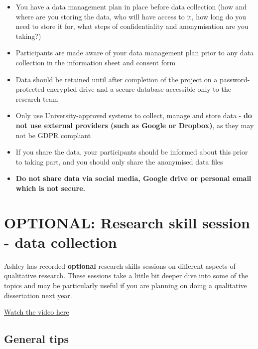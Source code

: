\documentclass[
  english,
  letterpaper,
  DIV=11,
  numbers=noendperiod]{scrreprt}
\providecommand{\tightlist}{%
  \setlength{\itemsep}{0pt}\setlength{\parskip}{0pt}}
\begin{document}
\begin{itemize}
\tightlist
\item
  You have a data management plan in place before data collection (how
  and where are you storing the data, who will have access to it, how
  long do you need to store it for, what steps of confidentiality and
  anonymisation are you taking?)
\item
  Participants are made aware of your data management plan prior to any
  data collection in the information sheet and consent form
\item
  Data should be retained until after completion of the project on a
  password-protected encrypted drive and a secure database accessible
  only to the research team
\item
  Only use University-approved systems to collect, manage and store data
  - \textbf{do not use external providers (such as Google or Dropbox)},
  as they may not be GDPR compliant
\item
  If you share the data, your participants should be informed about this
  prior to taking part, and you should only share the anonymised data
  files
\item
  \textbf{Do not share data via social media, Google drive or personal
  email which is not secure.}
\end{itemize}

\section{OPTIONAL: Research skill session - data
collection}\label{optional-research-skill-session---data-collection}

Ashley has recorded \textbf{optional} research skills sessions on
different aspects of qualitative research. These sessions take a little
bit deeper dive into some of the topics and may be particularly useful
if you are planning on doing a qualitative dissertation next year.

\href{https://echo360.org.uk/media/1f84181c-364e-47e3-a61e-415e4ec5a368/public?autoplay=false&automute=false&startTimeMillis=0}{Watch
the video here}

\subsection{General tips}\label{general-tips}
\end{document}
